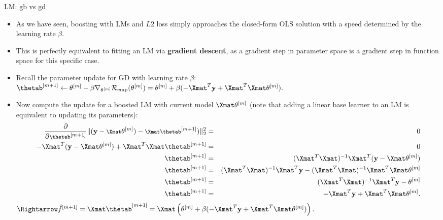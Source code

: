 
\begin{vbframe}{LM: gb vs gd}

\footnotesize

\begin{itemize}
  \item As we have seen, boosting with LMs and $L2$ 
  loss simply approaches the closed-form OLS solution with a speed determined by 
  the learning rate $\beta$.
  \item This is perfectly equivalent to fitting an LM via 
  \textbf{gradient descent}, as a gradient step in parameter space is a 
  gradient step in function space for this specific case.
  \item Recall the parameter update for GD with learning rate $\beta$:
  $\thetab^{[m+1]} \leftarrow \thetam - \beta \nabla_{\thetam} 
  \riske(\thetam) =  
  \thetam + \beta (-\Xmat^T \ydat + \Xmat^T\Xmat \thetam).$ \\
  \item Now compute the update for a boosted LM with current model 
  $\Xmat \thetam$ (note that adding a linear base learner to an LM is 
  equivalent to updating its parameters):
  \begin{eqnarray*}
    \footnotesize
    \frac{\partial}{\partial \thetab^{[m+1]}} 
    \| (\ydat - \Xmat \thetam) - \Xmat \thetab^{[m+1]}) \|^2_2 &=& 0 \\
    -\Xmat^T (\ydat - \Xmat \thetam) + \Xmat^T\Xmat 
    \thetab^{[m+1]} &=& 0 \\
    \thetab^{[m+1]} &=& (\Xmat^T\Xmat)^{-1} \Xmat^T 
    (\ydat - \Xmat \thetam) \\
    \thetab^{[m+1]} &=& (\Xmat^T\Xmat)^{-1} \Xmat^T \ydat
    - (\Xmat^T\Xmat)^{-1} \Xmat^T \Xmat \thetam \\
    \thetab^{[m+1]} &=& (\Xmat^T\Xmat)^{-1} \Xmat^T \ydat
    - \thetam %
    \\
    \thetab^{[m+1]} &=& - \Xmat^T \ydat + \Xmat^T\Xmat 
    \thetam.
  \end{eqnarray*}
  $\Rightarrow \fh^{[m+1]} = \Xmat \tilde \thetab^{[m+1]} = 
  \Xmat \left( \thetam + \beta (-\Xmat^T \ydat + 
  \Xmat^T\Xmat \thetam) \right).$
\end{itemize}



\end{vbframe}


\endlecture


